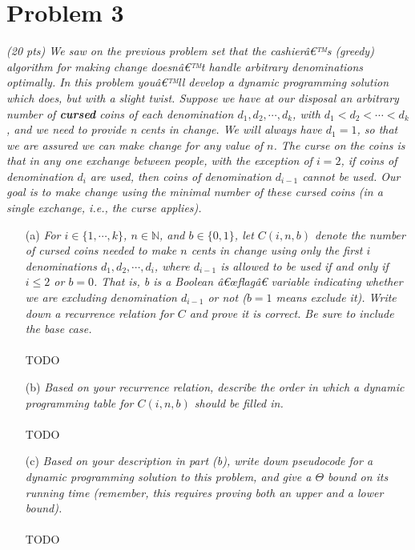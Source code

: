 \documentclass[12pt]{article}
\begin{document}
\newpage

\section*{Problem 3}

\textit{(20 pts) We saw on the previous problem set that the cashierâ€™s (greedy) algorithm
for making change doesnâ€™t handle arbitrary denominations optimally. In this problem
youâ€™ll develop a dynamic programming solution which does, but with a slight twist.
Suppose we have at our disposal an arbitrary number of \textbf{cursed} coins of each denomination $d_1 , d_2, \cdots, d_k$, with $d_1 < d_2 < \cdots < d_k$, and we need to provide n cents in change.
We will always have $d_1 = 1$, so that we are assured we can make change for any value
of $n$. The curse on the coins is that in any one exchange between people, with the
exception of $i = 2$, if coins of denomination $d_i$ are used, then coins of denomination
$d_{i-1}$ cannot be used. Our goal is to make change using the minimal number of these
cursed coins (in a single exchange, i.e., the curse applies).}

\begin{enumerate}
\item[(a)]\textit{For $i \in \{1, \cdots, k \}$, $n \in \mathbb{N}$, and $b \in \{0,1\}$, let $C(i, n, b)$ denote the number of cursed coins needed to make $n$ cents in change using only the first $i$ denominations
$d_1, d_2, \cdots, d_i$, where $d_{i-1}$ is allowed to be used if and only if $i \le 2$ or $b = 0$. That is, b is a Boolean â€œflagâ€ variable indicating whether we are excluding denomination
$d_{i-1}$ or not ($b = 1$ means exclude it). Write down a recurrence relation for $C$ and
prove it is correct. Be sure to include the base case.}
\\\\
TODO
\\
\item[(b)]\textit{Based on your recurrence relation, describe the order in which a dynamic programming table for $C(i, n, b)$ should be filled in.}
\\\\
TODO
\\
\item[(c)]\textit{Based on your description in part (b), write down pseudocode for a dynamic
programming solution to this problem, and give a $\Theta$ bound on its running time
(remember, this requires proving both an upper and a lower bound).}
\\\\
TODO

\end{enumerate}
\end{document}
